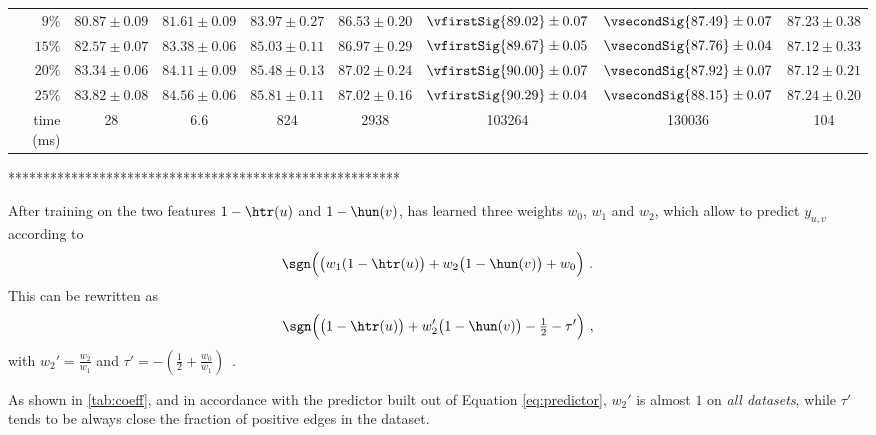 {\begin{longtable}{lrccc|cccc}
                                                  & $9\%$  &  $80.87 \pm 0.09$  &  $81.61 \pm 0.09$  &  $83.97 \pm 0.27$  &  $86.53 \pm 0.20$  &   $\vfirstSig{89.02} \pm 0.07$  &  $\vsecondSig{87.49} \pm 0.07$  &               $87.23 \pm 0.38$  \\
                                                  & $15\%$ &  $82.57 \pm 0.07$  &  $83.38 \pm 0.06$  &  $85.03 \pm 0.11$  &  $86.97 \pm 0.29$  &   $\vfirstSig{89.67} \pm 0.05$  &  $\vsecondSig{87.76} \pm 0.04$  &               $87.12 \pm 0.33$  \\
                                                  & $20\%$ &  $83.34 \pm 0.06$  &  $84.11 \pm 0.09$  &  $85.48 \pm 0.13$  &  $87.02 \pm 0.24$  &   $\vfirstSig{90.00} \pm 0.07$  &  $\vsecondSig{87.92} \pm 0.07$  &               $87.12 \pm 0.21$  \\
                                                  & $25\%$ &  $83.82 \pm 0.08$  &  $84.56 \pm 0.06$  &  $85.81 \pm 0.11$  &  $87.02 \pm 0.16$  &   $\vfirstSig{90.29} \pm 0.04$  &  $\vsecondSig{88.15} \pm 0.07$  &               $87.24 \pm 0.20$  \\
                                                  & time (ms)   &                           28 &                           6.6 &                           824 &               2938 &                         103264 &             130036 &              104 \\
\bottomrule
\end{longtable}}
********************************************************
\fi



After training on the two features $1-\htr(u)$ and $1-\hun(v)$, \uslogregp{} has learned three
weights $w_0$, $w_1$ and $w_2$, which allow to predict $y_{u,v}$ according to 
\[ 
  \sgn\Big(\big(w_1(1-\htr(u)\big) + w_2 \big(1-\hun(v)\big) + w_0\Big)~.
\]
This can be rewritten as 
\[
\sgn\Big(\big(1-\htr(u)\big) + w_2'\big(1-\hun(v)\big) - \tfrac{1}{2} -\tau'\Big)~,
\]
with $w_2' = \frac{w_2}{w_1}$ and $\tau' = - \left(\frac{1}{2} + \frac{w_0}{w_1}\right)$~.
	
As shown in \autoref{tab:coeff}, and in accordance with the predictor built out of Equation
\eqref{eq:predictor}, $w_2'$ is almost $1$ on \emph{all datasets}, while $\tau'$ tends to be always
close the fraction of positive edges in the dataset.


